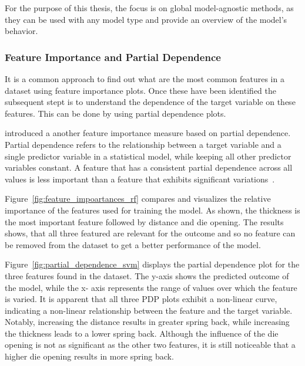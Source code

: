 For the purpose of this thesis, the focus is on global model-agnostic
methods, as they can be used
with any model type and provide an overview of the model's behavior.

\subsubsection{Feature Importance and Partial Dependence}
It is a common approach to find out what are the most common features in a dataset using feature
importance plots.
Once these have been identified the subsequent stept is to understand the dependence of the
target variable on these features.
This can be done by using partial dependence plots.

\cite{greenwell2018simple} introduced a another feature importance measure based on partial
dependence.
Partial dependence refers to the relationship between a target variable and a single predictor
variable in a statistical model, while keeping all other predictor variables constant.
A feature that has a consistent partial dependence across all values is less important than a
feature that exhibits significant variations~\cite[p. 117--118]{molnar2020interpretable}.

Figure~\ref{fig:feature_impoartances_rf} compares and visualizes the relative
importance of the features used for training the model.
As shown, the thickness is the most important feature followed by distance
and die opening.
The results shows, that all three featured are relevant for the outcome and so no feature can be
removed from the dataset to get a better performance of the model.

Figure~\ref{fig:partial_dependence_svm} displays the partial dependence plot for the three
features found in the dataset.
The y-axis shows the predicted outcome of the model, while the x-
axis represents the range of values over which the feature is varied.
It is apparent that all three PDP plots exhibit a non-linear curve, indicating a non-linear
relationship between the feature and the target variable.
Notably, increasing the distance
results in greater spring back, while increasing the thickness leads to a lower spring back.
Although the influence of the die opening is not as significant as the other two features, it is
still noticeable that a higher die opening results in more spring back.

